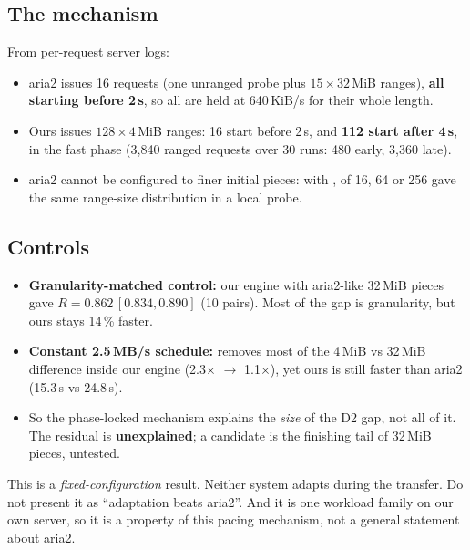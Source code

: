 \subsection{The mechanism}
From per-request server logs:
\begin{itemize}
\item aria2 issues 16 requests (one unranged probe plus $15\times32$\,MiB ranges), \textbf{all starting before 2\,s}, so all are held at 640\,KiB/s for their whole length.
\item Ours issues $128\times4$\,MiB ranges: 16 start before 2\,s, and \textbf{112 start after 4\,s}, in the fast phase (3{,}840 ranged requests over 30 runs: 480 early, 3{,}360 late).
\item aria2 cannot be configured to finer initial pieces: with ,  of 16, 64 or 256 gave the same range-size distribution in a local probe.
\end{itemize}

\subsection{Controls}
\begin{itemize}
\item \textbf{Granularity-matched control:} our engine with aria2-like 32\,MiB pieces gave $R = 0.862\,[0.834, 0.890]$ (10 pairs). Most of the gap is granularity, but ours stays 14\,\% faster.
\item \textbf{Constant 2.5\,MB/s schedule:} removes most of the 4\,MiB vs 32\,MiB difference inside our engine (2.3$\times$ $\rightarrow$ 1.1$\times$), yet ours is still faster than aria2 (15.3\,s vs 24.8\,s).
\item So the phase-locked mechanism explains the \emph{size} of the D2 gap, not all of it. The residual is \textbf{unexplained}; a candidate is the finishing tail of 32\,MiB pieces, untested.
\end{itemize}

\begin{careful}
This is a \emph{fixed-configuration} result. Neither system adapts during the transfer. Do not present it as ``adaptation beats aria2''. And it is one workload family on our own server, so it is a property of this pacing mechanism, not a general statement about aria2.
\end{careful}

